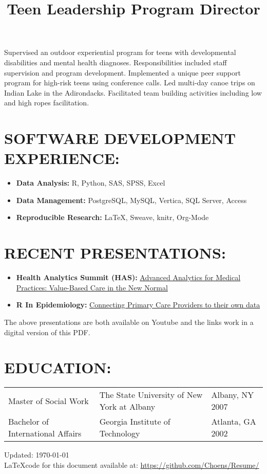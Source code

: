 \documentclass[line, mm, 10pt]{res}
\begin{document}
\begin{resume}
  \title{Teen Leadership Program Director}
  \begin{position}
    Supervised an outdoor experiential program for teens with
    developmental disabilities and mental health
    diagnoses. Responsibilities included staff supervision and program
    development. Implemented a unique peer support program for
    high-risk teens using conference calls. Led multi-day canoe trips
    on Indian Lake in the Adirondacks. Facilitated team building
    activities including low and high ropes facilitation.
  \end{position}

  \section{SOFTWARE DEVELOPMENT EXPERIENCE:}

  \begin{itemize}
    \item {\bf Data Analysis:} R, Python, SAS, SPSS, Excel
    \item {\bf Data Management:} PostgreSQL, MySQL, Vertica, SQL Server, Access
    \item {\bf Reproducible Research:} \LaTeX, Sweave, knitr, Org-Mode
  \end{itemize}

  \section{RECENT PRESENTATIONS:}
  \begin{itemize}
    \item {\bf Health Analytics Summit (HAS):} {\href{https://www.youtube.com/watch?v=--vqwbJucPs}{Advanced Analytics for Medical Practices: Value-Based Care in the New Normal}}
    \item {\bf R In Epidemiology:} {\href{https://www.youtube.com/watch?v=-zhTXiiCj58}{Connecting Primary Care Providers to their own data}}
    \end{itemize}

    The above presentations are both available on Youtube and the
    links work in a digital version of this PDF.
  
  \section{EDUCATION:}
  \begin{tabular} {p{2.25in} p{2.75in} p{2in}}
    Master of Social Work & The State University of New  York at Albany & Albany, NY 2007 \\
    Bachelor of International Affairs & Georgia Institute of Technology & Atlanta, GA 2002 \\
  \end{tabular}


\end{resume}

\vspace{.25in}
Updated: \today \\
\LaTeX code for this document available at:
\href{https://github.com/Choens/Resume/}{https://github.com/Choens/Resume/}
\end{document}
